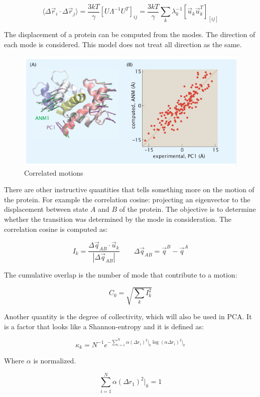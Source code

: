 		$$\langle\Delta\vec{r}_i\cdot\Delta\vec{r}_j\rangle = \frac{3kT}{\gamma}[U\Lambda^{-1}U^T]_{ij} = \frac{3kT}{\gamma}\sum\limits_{k}\lambda_k^{-1}[\vec{u}_k\vec{u}_k^T]_[ij]$$

		The displacement of a protein can be computed from the modes.
		The direction of each mode is considered.
		This model does not treat all direction as the same.

		\begin{figure}[H]
			\includegraphics[width=\textwidth]{asm-correlated-motion}
			\caption{Correlated motions}
			\label{fig:as-correlated-motion}
		\end{figure}

		There are other instructive quantities that tells something more on the motion of the protein.
		For example the correlation cosine: projecting an eigenvector to the displacement between state $A$ and $B$ of the protein.
		The objective is to determine whether the transition was determined by the mode in consideration.
		The correlation cosine is computed as:

		$$I_k = \frac{\Delta\vec{q}_{AB}\cdot\vec{u}_k}{|\Delta\vec{q}_{AB}|}\qquad \Delta\vec{q}_{AB} = \vec{q}^B-\vec{q}^A$$

		The cumulative overlap is the number of mode that contribute to a motion:

		$$C_0 = \sqrt{\sum\limits_k I_k^2}$$

		Another quantity is the degree of collectivity, which will also be used in PCA.
		It is a factor that looks like a Shannon-entropy and it is defined as:

		$$\kappa_k = N^{-1}e^{-\sum\limits_{i=1}^N\alpha(\Delta r_i)^2\rvert_k\log(\alpha\Delta r_i)^2\rvert_k}$$

		Where $\alpha$ is normalized.

		$$\sum\limits_{i=1}^N\alpha(\Delta r_1)^2\rvert_k = 1$$

